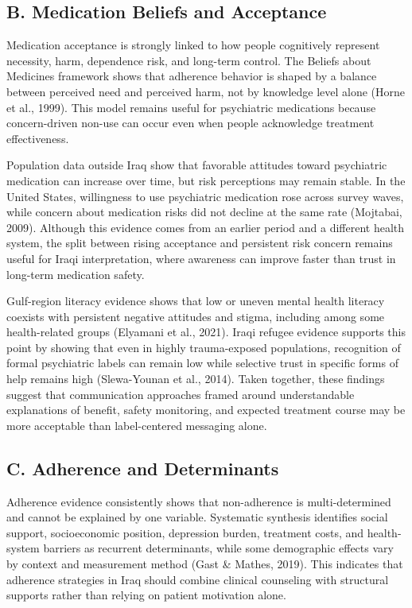 \documentclass[12pt,a4paper]{article}
\begin{document}
\subsection*{B. Medication Beliefs and Acceptance}
Medication acceptance is strongly linked to how people cognitively represent necessity, harm, dependence risk, and long-term control. The Beliefs about Medicines framework shows that adherence behavior is shaped by a balance between perceived need and perceived harm, not by knowledge level alone (Horne et al., 1999). This model remains useful for psychiatric medications because concern-driven non-use can occur even when people acknowledge treatment effectiveness.

Population data outside Iraq show that favorable attitudes toward psychiatric medication can increase over time, but risk perceptions may remain stable. In the United States, willingness to use psychiatric medication rose across survey waves, while concern about medication risks did not decline at the same rate (Mojtabai, 2009). Although this evidence comes from an earlier period and a different health system, the split between rising acceptance and persistent risk concern remains useful for Iraqi interpretation, where awareness can improve faster than trust in long-term medication safety.

Gulf-region literacy evidence shows that low or uneven mental health literacy coexists with persistent negative attitudes and stigma, including among some health-related groups (Elyamani et al., 2021). Iraqi refugee evidence supports this point by showing that even in highly trauma-exposed populations, recognition of formal psychiatric labels can remain low while selective trust in specific forms of help remains high (Slewa-Younan et al., 2014). Taken together, these findings suggest that communication approaches framed around understandable explanations of benefit, safety monitoring, and expected treatment course may be more acceptable than label-centered messaging alone.

\subsection*{C. Adherence and Determinants}
Adherence evidence consistently shows that non-adherence is multi-determined and cannot be explained by one variable. Systematic synthesis identifies social support, socioeconomic position, depression burden, treatment costs, and health-system barriers as recurrent determinants, while some demographic effects vary by context and measurement method (Gast \& Mathes, 2019). This indicates that adherence strategies in Iraq should combine clinical counseling with structural supports rather than relying on patient motivation alone.
\end{document}

